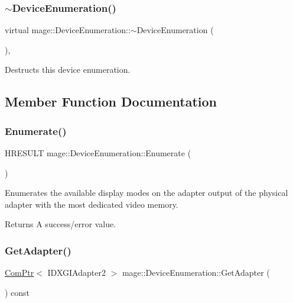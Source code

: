 \subsubsection{\texorpdfstring{$\sim$\+Device\+Enumeration()}{~DeviceEnumeration()}}
{\footnotesize\ttfamily virtual mage\+::\+Device\+Enumeration\+::$\sim$\+Device\+Enumeration (\begin{DoxyParamCaption}{ }\end{DoxyParamCaption})\hspace{0.3cm}{\ttfamily [protected]}, {\ttfamily [virtual]}}

Destructs this device enumeration. 

\subsection{Member Function Documentation}
\hypertarget{classmage_1_1_device_enumeration_a4fea0ffef733632456b281f74608a239}{}\label{classmage_1_1_device_enumeration_a4fea0ffef733632456b281f74608a239} 
\subsubsection{\texorpdfstring{Enumerate()}{Enumerate()}}
{\footnotesize\ttfamily H\+R\+E\+S\+U\+LT mage\+::\+Device\+Enumeration\+::\+Enumerate (\begin{DoxyParamCaption}{ }\end{DoxyParamCaption})\hspace{0.3cm}{\ttfamily [protected]}}

Enumerates the available display modes on the adapter output of the physical adapter with the most dedicated video memory.

\begin{DoxyReturn}{Returns}
A success/error value. 
\end{DoxyReturn}
\hypertarget{classmage_1_1_device_enumeration_ad8a0702abdc70ea8fc1b6e46544839a1}{}\label{classmage_1_1_device_enumeration_ad8a0702abdc70ea8fc1b6e46544839a1} 
\subsubsection{\texorpdfstring{Get\+Adapter()}{GetAdapter()}}
{\footnotesize\ttfamily \hyperlink{namespacemage_ae74f374780900893caa5555d1031fd79}{Com\+Ptr}$<$ I\+D\+X\+G\+I\+Adapter2 $>$ mage\+::\+Device\+Enumeration\+::\+Get\+Adapter (\begin{DoxyParamCaption}{ }\end{DoxyParamCaption}) const}

